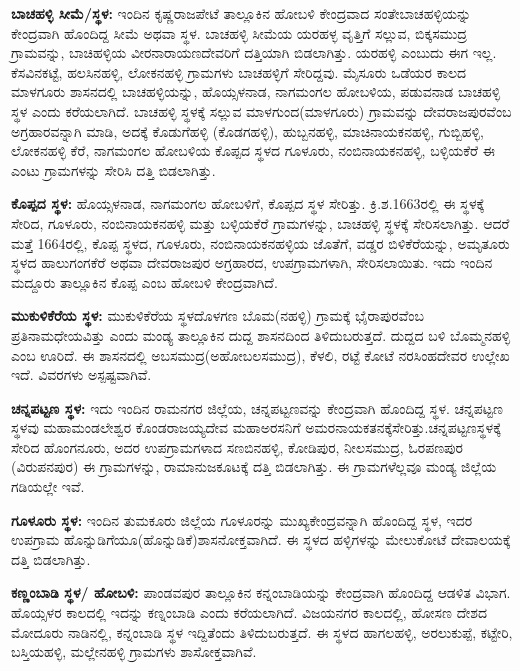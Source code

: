 \textbf{ಬಾಚಹಳ್ಳಿ ಸೀಮೆ/ಸ್ಥಳ:} ಇಂದಿನ ಕೃಷ್ಣರಾಜಪೇಟೆ ತಾಲ್ಲೂಕಿನ ಹೋಬಳಿ ಕೇಂದ್ರವಾದ ಸಂತೇಬಾಚಹಳ್ಳಿಯನ್ನು ಕೇಂದ್ರವಾಗಿ ಹೊಂದಿದ್ದ ಸೀಮೆ ಅಥವಾ ಸ್ಥಳ. ಬಾಚಹಳ್ಳಿ ಸೀಮೆಯ ಯರಹಳ್ಳ ವೃತ್ತಿಗೆ ಸಲ್ಲುವ, ಬಿಕ್ಕಸಮುದ್ರ ಗ್ರಾಮವನ್ನು, ಬಾಚಿಹಳ್ಳಿಯ ವೀರನಾರಾಯಣದೇವರಿಗೆ ದತ್ತಿಯಾಗಿ ಬಿಡಲಾಗಿತ್ತು. ಯರಹಳ್ಳಿ ಎಂಬುದು ಈಗ ಇಲ್ಲ. ಕೆಸವಿನಕಟ್ಟೆ, ಹಲಸಿನಹಳ್ಳಿ, ಲೋಕನಹಳ್ಳಿ ಗ್ರಾಮಗಳು ಬಾಚಹಳ್ಳಿಗೆ ಸೇರಿದ್ದವು. ಮೈಸೂರು ಒಡೆಯರ ಕಾಲದ ಮಾಳಗೂರು ಶಾಸನದಲ್ಲಿ ಬಾಚಹಳ್ಳಿಯನ್ನು, ಹೊಯ್ಸಳನಾಡ, ನಾಗಮಂಗಲ ಹೋಬಳಿಯ, ಪಡುವನಾಡ ಬಾಚಹಳ್ಳಿ ಸ್ಥಳ ಎಂದು ಕರೆಯಲಾಗಿದೆ. ಬಾಚಹಳ್ಳಿ ಸ್ಥಳಕ್ಕೆ ಸಲ್ಲುವ ಮಾಳಗುಂದ(ಮಾಳಗೂರು) ಗ್ರಾಮವನ್ನು ದೇವರಾಜಪುರವೆಂಬ ಅಗ್ರಹಾರವನ್ನಾಗಿ ಮಾಡಿ, ಅದಕ್ಕೆ ಕೊಡುಗೆಹಳ್ಳಿ (ಕೊಡಗಹಳ್ಳಿ), ಹುಬ್ಬನಹಳ್ಳಿ, ಮಾಚಿನಾಯಕನಹಳ್ಳಿ, ಗುಬ್ಬಿಹಳ್ಳಿ, ಲೋಕನಹಳ್ಳಿ ಕೆರೆ, ನಾಗಮಂಗಲ ಹೋಬಳಿಯ ಕೊಪ್ಪದ ಸ್ಥಳದ ಗೂಳೂರು, ನಂಬಿನಾಯಕನಹಳ್ಳಿ, ಬಳ್ಳಿಯಕೆರೆ ಈ ಎಂಟು ಗ್ರಾಮಗಳನ್ನು ಸೇರಿಸಿ ದತ್ತಿ ಬಿಡಲಾಗಿತ್ತು.

\textbf{ಕೊಪ್ಪದ ಸ್ಥಳ:} ಹೊಯ್ಸಳನಾಡ, ನಾಗಮಂಗಲ ಹೋಬಳಿಗೆ, ಕೊಪ್ಪದ ಸ್ಥಳ ಸೇರಿತ್ತು. ಕ್ರಿ.ಶ.1663ರಲ್ಲಿ ಈ ಸ್ಥಳಕ್ಕೆ ಸೇರಿದ, ಗೂಳೂರು, ನಂಬಿನಾಯಕನಹಳ್ಳಿ ಮತ್ತು ಬಳ್ಳಿಯಕೆರೆ ಗ್ರಾಮಗಳನ್ನು, ಬಾಚಹಳ್ಳಿ ಸ್ಥಳಕ್ಕೆ ಸೇರಿಸಲಾಗಿತ್ತು. ಆದರೆ ಮತ್ತೆ 1664ರಲ್ಲಿ, ಕೊಪ್ಪ ಸ್ಥಳದ, ಗೂಳೂರು, ನಂಬಿನಾಯಕನಹಳ್ಳಿಯ ಜೊತೆಗೆ, ವಡ್ಡರ ಬಿಳಿಕೆರೆಯನ್ನು, ಅಮೃತೂರು ಸ್ಥಳದ ಹಾಲುಗಂಗಕೆರೆ ಅಥವಾ ದೇವರಾಜಪುರ ಅಗ್ರಹಾರದ, ಉಪಗ್ರಾಮಗಳಾಗಿ, ಸೇರಿಸಲಾಯಿತು. ಇದು ಇಂದಿನ ಮದ್ದೂರು ತಾಲ್ಲೂಕಿನ ಕೊಪ್ಪ ಎಂಬ ಹೋಬಳಿ ಕೇಂದ್ರವಾಗಿದೆ.

\textbf{ಮುಕುಳಿಕೆರೆಯ ಸ್ಥಳ:} ಮುಕುಳಿಕೆರೆಯ ಸ್ಥಳದೊಳಗಣ ಬೊಮ(ನಹಳ್ಳಿ) ಗ್ರಾಮಕ್ಕೆ ಭೈರಾಪುರವೆಂಬ ಪ್ರತಿನಾಮ\-ಧೇಯವಿತ್ತು ಎಂದು ಮಂಡ್ಯ ತಾಲ್ಲೂಕಿನ ದುದ್ದ ಶಾಸನದಿಂದ ತಿಳಿದುಬರುತ್ತದೆ. ದುದ್ದದ ಬಳಿ ಬೊಮ್ಮನಹಳ್ಳಿ ಎಂಬ ಊರಿದೆ. ಈ ಶಾಸನದಲ್ಲಿ ಅಬಸಮುದ್ರ(ಅಹೋಬಲಸಮುದ್ರ), ಕೆಳಲಿ, ರಟ್ಟೆ ಕೋಟೆ ನರಸಿಂಹದೇವರ ಉಲ್ಲೇಖ ಇದೆ. ವಿವರಗಳು ಅಸ್ಪಷ್ಟವಾಗಿವೆ.

\textbf{ಚನ್ನಪಟ್ಟಣ ಸ್ಥಳ:} ಇದು ಇಂದಿನ ರಾಮನಗರ ಜಿಲ್ಲೆಯ, ಚನ್ನಪಟ್ಟಣವನ್ನು ಕೇಂದ್ರವಾಗಿ ಹೊಂದಿದ್ದ ಸ್ಥಳ. ಚನ್ನಪಟ್ಟಣ ಸ್ಥಳವು ಮಹಾಮಂಡಲೇಶ್ವರ ಕೊಂಡರಾಜಯ್ಯದೇವ ಮಹಾಅರಸನಿಗೆ ಅಮರನಾಯಕತನಕ್ಕೆಸೇರಿತ್ತು.\break ಚನ್ನಪಟ್ಟಣಸ್ಥಳಕ್ಕೆ ಸೇರಿದ ಹೊಂಗನೂರು, ಅದರ ಉಪಗ್ರಾಮಗಳಾದ ಸಣಬಿನಹಳ್ಳಿ, ಕೋಡಿಪುರ, ನೀಲಸಮುದ್ರ, ಓರಪಣಪುರ (ವಿರುಪನಪುರ) ಈ ಗ್ರಾಮಗಳನ್ನು, ರಾಮಾನುಜಕೂಟಕ್ಕೆ ದತ್ತಿ ಬಿಡಲಾಗಿತ್ತು. ಈ ಗ್ರಾಮಗಳೆಲ್ಲವೂ ಮಂಡ್ಯ ಜಿಲ್ಲೆಯ ಗಡಿಯಲ್ಲೇ ಇವೆ.

\textbf{ಗೂಳೂರು ಸ್ಥಳ: }ಇಂದಿನ ತುಮಕೂರು ಜಿಲ್ಲೆಯ ಗೂಳೂರನ್ನು ಮುಖ್ಯಕೇಂದ್ರವನ್ನಾಗಿ ಹೊಂದಿದ್ದ ಸ್ಥಳ, ಇದರ ಉಪಗ್ರಾಮ ಹೊನ್ನುಡಿಗೆಯೂ(ಹೊನ್ನುಡಿಕೆ)ಶಾಸನೋಕ್ತವಾಗಿದೆ. ಈ ಸ್ಥಳದ ಹಳ್ಳಿಗಳನ್ನು ಮೇಲುಕೋಟೆ ದೇವಾಲಯಕ್ಕೆ ದತ್ತಿ ಬಿಡಲಾಗಿತ್ತು.

\textbf{ಕಣ್ಣಂಬಾಡಿ ಸ್ಥಳ/ ಹೋಬಳಿ:} ಪಾಂಡವಪುರ ತಾಲ್ಲೂಕಿನ ಕನ್ನಂಬಾಡಿಯನ್ನು ಕೇಂದ್ರವಾಗಿ ಹೊಂದಿದ್ದ ಆಡಳಿತ ವಿಭಾಗ. ಹೊಯ್ಸಳರ ಕಾಲದಲ್ಲಿ ಇದನ್ನು ಕಣ್ನಂಬಾಡಿ ಎಂದು ಕರೆಯಲಾಗಿದೆ. ವಿಜಯನಗರ ಕಾಲದಲ್ಲಿ, ಹೋಸಣ ದೇಶದ ಮೋದೂರು ನಾಡಿನಲ್ಲಿ, ಕನ್ನಂಬಾಡಿ ಸ್ಥಳ ಇದ್ದಿತೆಂದು ತಿಳಿದುಬರುತ್ತದೆ. ಈ ಸ್ಥಳದ ಹಾಗಲಹಳ್ಳಿ, ಅರಲುಕುಪ್ಪೆ, ಕಟ್ಟೇರಿ, ಬಸ್ತಿಯಹಳ್ಳಿ, ಮಲ್ಲೇನಹಳ್ಳಿ ಗ್ರಾಮಗಳು ಶಾಸೋಕ್ತವಾಗಿವೆ.


